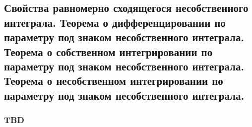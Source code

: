\subsection{Свойства равномерно сходящегося несобственного интеграла. Теорема о дифференцировании по параметру под знаком несобственного интеграла. Теорема о собственном интегрировании по параметру под знаком несобственного интеграла. Теорема о несобственном интегрировании по параметру под знаком несобственного интеграла.}

\subsubsection{TBD}